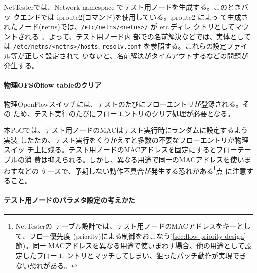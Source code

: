 NetTesterでは、Network namespace でテスト用ノードを生成する。このときバッ
クエンドでは iproute2(コマンド)を使用している。iproute2 によっ
て生成されたノード(netns)では、\verb|/etc/netns/<netns>/| が etc ディレ
クトリとしてマウントされる~\cite{iproute2-doc}。よって、テスト用ノード内
部での名前解決などでは、実体としては \verb|/etc/netns/<netns>/hosts|,
\verb|resolv.conf| を参照する。これらの設定ファイル等が正しく設定されて
いないと、名前解決がタイムアウトするなどの問題が発生する。

    \paragraph{物理OFSのflow tableのクリア}
物理OpenFlowスイッチには、テストのたびにフローエントリが登録される。その
ため、テスト実行のたびにフローエントリのクリア処理が必要となる。

本PoCでは、テスト用ノードのMACはテスト実行時にランダムに設定するよう実装
したため、テスト実行をくりかえすと多数の不要なフローエントリが物理スイッ
チ上に残る。テスト用ノードのMACアドレスを固定にするとフローテーブルの消
費は抑えられる。しかし、異なる用途で同一のMACアドレスを使いまわすなどの
ケースで、予期しない動作不具合が発生する恐れがある\footnote{NetTesterの
テーブル設計では、テスト用ノードのMACアドレスをキーとして、フロー優先度
(priority)による制御をおこなう(\ref{sec:flow-priority-design}節)。同一
MACアドレスを異なる用途で使いまわす場合、他の用途として設定したフローエ
ントリとマッチしてしまい、狙ったパッチ動作が実現できない恐れがある。}点
に注意すること。

    \paragraph{テスト用ノードのパラメタ設定の考えかた}

